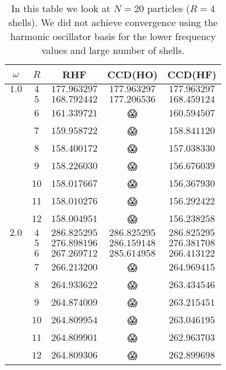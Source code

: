 \documentclass[
    a4paper, aps, twocolumn, floatfix, superscriptaddress,
    nofootinbib]{revtex4-1}
\newcommand{\nan}{\DejaSans 😱}
\newcommand{\1}{\mathds{1}}
\begin{document}
    \begin{table}
        \centering
        \caption{In this table we look at $N = 20$ particles ($R = 4$ shells).
        We did not achieve convergence using the harmonic oscillator basis for
        the lower frequency values and large number of shells.}
        \begin{ruledtabular}
            \begin{tabular}{c|c|ccc}
                $\omega$ & $R$ & RHF & CCD(HO) & CCD(HF) \\
                \hline
                $1.0$ & $4$ & $177.963297$ & $177.963297$ & $177.963297$ \\
                      & $5$ & $168.792442$ & $177.206536$ & $168.459124$ \\
                      & $6$ & $161.339721$ & \nan & $160.594507$ \\
                      & $7$ & $159.958722$ & \nan & $158.841120$ \\
                      & $8$ & $158.400172$ & \nan & $157.038330$ \\
                      & $9$ & $158.226030$ & \nan & $156.676039$ \\
                      & $10$ & $158.017667$ & \nan & $156.367930$ \\
                      & $11$ & $158.010276$ & \nan & $156.292422$ \\
                      & $12$ & $158.004951$ & \nan & $156.238258$ \\
                \hline
                $2.0$ & $4$ & $286.825295$ & $286.825295$ & $286.825295$ \\
                      & $5$ & $276.898196$ & $286.159148$ & $276.381708$ \\
                      & $6$ & $267.269712$ & $285.614958$ & $266.413122$ \\
                      & $7$ & $266.213200$ & \nan & $264.969415$ \\
                      & $8$ & $264.933622$ & \nan & $263.434546$ \\
                      & $9$ & $264.874009$ & \nan & $263.215451$ \\
                      & $10$ & $264.809954$ & \nan & $263.046195$ \\
                      & $11$ & $264.809901$ & \nan & $262.963703$ \\
                      & $12$ & $264.809306$ & \nan & $262.899698$ \\
                \hline

\end{tabular}
\end{ruledtabular}
\end{table}
\end{document}
